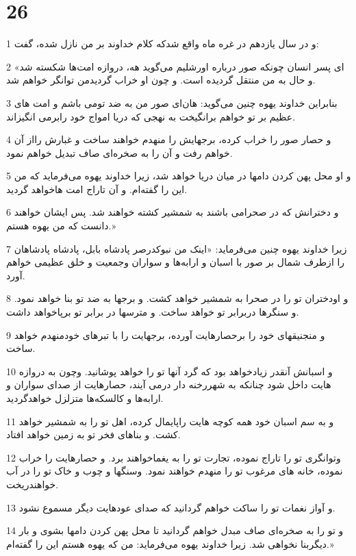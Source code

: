 \chapter{26}

\par 1 و در سال یازدهم در غره ماه واقع شدکه کلام خداوند بر من نازل شده، گفت:
\par 2 «ای پسر انسان چونکه صور درباره اورشلیم می‌گوید هه، دروازه امت‌ها شکسته شد و حال به من منتقل گردیده است. و چون او خراب گردیدمن توانگر خواهم شد.
\par 3 بنابراین خداوند یهوه چنین می‌گوید: هان‌ای صور من به ضد تومی باشم و امت های عظیم بر تو خواهم برانگیخت به نهجی که دریا امواج خود رابرمی انگیزاند.
\par 4 و حصار صور را خراب کرده، برجهایش را منهدم خواهند ساخت و غبارش رااز آن خواهم رفت و آن را به صخره‌ای صاف تبدیل خواهم نمود.
\par 5 و او محل پهن کردن دامها در میان دریا خواهد شد، زیرا خداوند یهوه می‌فرماید که من این را گفته‌ام. و آن تاراج امت هاخواهد گردید.
\par 6 و دخترانش که در صحرامی باشند به شمشیر کشته خواهند شد. پس ایشان خواهند دانست که من یهوه هستم.»
\par 7 زیرا خداوند یهوه چنین می‌فرماید: «اینک من نبوکدرصر پادشاه بابل، پادشاه پادشاهان را ازطرف شمال بر صور با اسبان و ارابه‌ها و سواران وجمعیت و خلق عظیمی خواهم آورد.
\par 8 و اودختران تو را در صحرا به شمشیر خواهد کشت. و برجها به ضد تو بنا خواهد نمود. و سنگرها دربرابر تو خواهد ساخت. و مترسها در برابر تو برپاخواهد داشت.
\par 9 و منجنیقهای خود را برحصارهایت آورده، برجهایت را با تبرهای خودمنهدم خواهد ساخت.
\par 10 و اسبانش آنقدر زیادخواهد بود که گرد آنها تو را خواهد پوشانید. وچون به دروازه هایت داخل شود چنانکه به شهررخنه دار درمی آیند، حصارهایت از صدای سواران و ارابه‌ها و کالسکه‌ها متزلزل خواهدگردید.
\par 11 و به سم اسبان خود همه کوچه هایت راپایمال کرده، اهل تو را به شمشیر خواهد کشت. و بناهای فخر تو به زمین خواهد افتاد.
\par 12 وتوانگری تو را تاراج نموده، تجارت تو را به یغماخواهند برد. و حصارهایت را خراب نموده، خانه های مرغوب تو را منهدم خواهند نمود. وسنگها و چوب و خاک تو را در آب خواهندریخت.
\par 13 و آواز نغمات تو را ساکت خواهم گردانید که صدای عودهایت دیگر مسموع نشود.
\par 14 و تو را به صخره‌ای صاف مبدل خواهم گردانید تا محل پهن کردن دامها بشوی و بار دیگربنا نخواهی شد. زیرا خداوند یهوه می‌فرماید: من که یهوه هستم این را گفته‌ام.»
